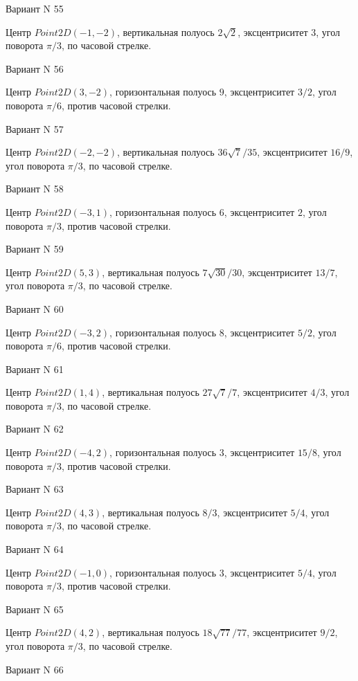 \documentclass[11pt]{report}
\begin{document}
Вариант N 55

Центр $Point2D\left(-1, -2\right)$, вертикальная полуось $2 \sqrt{2}$, эксцентриситет $3$, угол поворота $\pi / 3$, по часовой стрелке.

Вариант N 56

Центр $Point2D\left(3, -2\right)$, горизонтальная полуось $9$, эксцентриситет $3 / 2$, угол поворота $\pi / 6$, против часовой стрелки.

Вариант N 57

Центр $Point2D\left(-2, -2\right)$, вертикальная полуось $36 \sqrt{7} / 35$, эксцентриситет $16 / 9$, угол поворота $\pi / 3$, по часовой стрелке.

Вариант N 58

Центр $Point2D\left(-3, 1\right)$, горизонтальная полуось $6$, эксцентриситет $2$, угол поворота $\pi / 3$, против часовой стрелки.

Вариант N 59

Центр $Point2D\left(5, 3\right)$, вертикальная полуось $7 \sqrt{30} / 30$, эксцентриситет $13 / 7$, угол поворота $\pi / 3$, по часовой стрелке.

Вариант N 60

Центр $Point2D\left(-3, 2\right)$, горизонтальная полуось $8$, эксцентриситет $5 / 2$, угол поворота $\pi / 6$, против часовой стрелки.

Вариант N 61

Центр $Point2D\left(1, 4\right)$, вертикальная полуось $27 \sqrt{7} / 7$, эксцентриситет $4 / 3$, угол поворота $\pi / 3$, по часовой стрелке.

Вариант N 62

Центр $Point2D\left(-4, 2\right)$, горизонтальная полуось $3$, эксцентриситет $15 / 8$, угол поворота $\pi / 3$, против часовой стрелки.

Вариант N 63

Центр $Point2D\left(4, 3\right)$, вертикальная полуось $8 / 3$, эксцентриситет $5 / 4$, угол поворота $\pi / 3$, по часовой стрелке.

Вариант N 64

Центр $Point2D\left(-1, 0\right)$, горизонтальная полуось $3$, эксцентриситет $5 / 4$, угол поворота $\pi / 3$, против часовой стрелки.

Вариант N 65

Центр $Point2D\left(4, 2\right)$, вертикальная полуось $18 \sqrt{77} / 77$, эксцентриситет $9 / 2$, угол поворота $\pi / 3$, по часовой стрелке.

Вариант N 66
\end{document}
